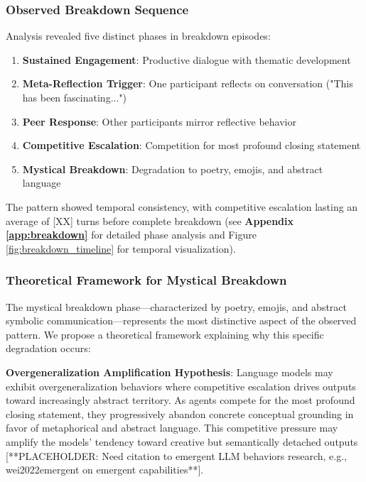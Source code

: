 \documentclass[11pt,letterpaper]{article}
\newcommand{\competitivePhaseLength}{[XX]} %
\begin{document}
\begin{enumerate}
\subsubsection{Observed Breakdown Sequence}

Analysis revealed five distinct phases in breakdown episodes:

\begin{enumerate}
    \item \textbf{Sustained Engagement}: Productive dialogue with thematic development
    \item \textbf{Meta-Reflection Trigger}: One participant reflects on conversation ("This has been fascinating...")
    \item \textbf{Peer Response}: Other participants mirror reflective behavior  
    \item \textbf{Competitive Escalation}: Competition for most profound closing statement
    \item \textbf{Mystical Breakdown}: Degradation to poetry, emojis, and abstract language
\end{enumerate}

The pattern showed temporal consistency, with competitive escalation lasting an average of \competitivePhaseLength{} turns before complete breakdown (see \textbf{Appendix \ref{app:breakdown}} for detailed phase analysis and Figure \ref{fig:breakdown_timeline} for temporal visualization).

\subsubsection{Theoretical Framework for Mystical Breakdown}

The mystical breakdown phase—characterized by poetry, emojis, and abstract symbolic communication—represents the most distinctive aspect of the observed pattern. We propose a theoretical framework explaining why this specific degradation occurs:

\textbf{Overgeneralization Amplification Hypothesis}: Language models may exhibit overgeneralization behaviors where competitive escalation drives outputs toward increasingly abstract territory. As agents compete for the most profound closing statement, they progressively abandon concrete conceptual grounding in favor of metaphorical and abstract language. This competitive pressure may amplify the models' tendency toward creative but semantically detached outputs [**PLACEHOLDER: Need citation to emergent LLM behaviors research, e.g., wei2022emergent on emergent capabilities**].


\end{enumerate}
\end{document}
